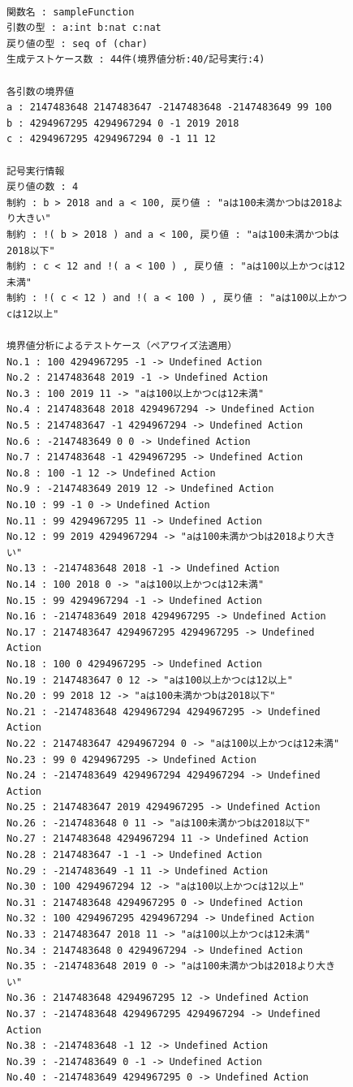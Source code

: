 \documentclass[uplatex, report, a4j, 10pt]{jsbook}
\begin{document}
\lstset{language=}
\begin{figure}[tp]
  \begin{lstlisting}[caption={拡張したBWDMに因子が3で水準が(6, 6, 6)の関数を持つ仕様(コード\ref{fig:pict4javaSampleVdm})を適用した際の出力},label=fig:pict4javaTekiyourei]

関数名 : sampleFunction
引数の型 : a:int b:nat c:nat 
戻り値の型 : seq of (char)
生成テストケース数 : 44件(境界値分析:40/記号実行:4)

各引数の境界値
a : 2147483648 2147483647 -2147483648 -2147483649 99 100 
b : 4294967295 4294967294 0 -1 2019 2018 
c : 4294967295 4294967294 0 -1 11 12 

記号実行情報
戻り値の数 : 4
制約 : b > 2018 and a < 100, 戻り値 : "aは100未満かつbは2018より大きい"
制約 : !( b > 2018 ) and a < 100, 戻り値 : "aは100未満かつbは2018以下"
制約 : c < 12 and !( a < 100 ) , 戻り値 : "aは100以上かつcは12未満"
制約 : !( c < 12 ) and !( a < 100 ) , 戻り値 : "aは100以上かつcは12以上"

境界値分析によるテストケース（ペアワイズ法適用）
No.1 : 100 4294967295 -1 -> Undefined Action
No.2 : 2147483648 2019 -1 -> Undefined Action
No.3 : 100 2019 11 -> "aは100以上かつcは12未満"
No.4 : 2147483648 2018 4294967294 -> Undefined Action
No.5 : 2147483647 -1 4294967294 -> Undefined Action
No.6 : -2147483649 0 0 -> Undefined Action
No.7 : 2147483648 -1 4294967295 -> Undefined Action
No.8 : 100 -1 12 -> Undefined Action
No.9 : -2147483649 2019 12 -> Undefined Action
No.10 : 99 -1 0 -> Undefined Action
No.11 : 99 4294967295 11 -> Undefined Action
No.12 : 99 2019 4294967294 -> "aは100未満かつbは2018より大きい"
No.13 : -2147483648 2018 -1 -> Undefined Action
No.14 : 100 2018 0 -> "aは100以上かつcは12未満"
No.15 : 99 4294967294 -1 -> Undefined Action
No.16 : -2147483649 2018 4294967295 -> Undefined Action
No.17 : 2147483647 4294967295 4294967295 -> Undefined Action
No.18 : 100 0 4294967295 -> Undefined Action
No.19 : 2147483647 0 12 -> "aは100以上かつcは12以上"
No.20 : 99 2018 12 -> "aは100未満かつbは2018以下"
No.21 : -2147483648 4294967294 4294967295 -> Undefined Action
No.22 : 2147483647 4294967294 0 -> "aは100以上かつcは12未満"
No.23 : 99 0 4294967295 -> Undefined Action
No.24 : -2147483649 4294967294 4294967294 -> Undefined Action
No.25 : 2147483647 2019 4294967295 -> Undefined Action
No.26 : -2147483648 0 11 -> "aは100未満かつbは2018以下"
No.27 : 2147483648 4294967294 11 -> Undefined Action
No.28 : 2147483647 -1 -1 -> Undefined Action
No.29 : -2147483649 -1 11 -> Undefined Action
No.30 : 100 4294967294 12 -> "aは100以上かつcは12以上"
No.31 : 2147483648 4294967295 0 -> Undefined Action
No.32 : 100 4294967295 4294967294 -> Undefined Action
No.33 : 2147483647 2018 11 -> "aは100以上かつcは12未満"
No.34 : 2147483648 0 4294967294 -> Undefined Action
No.35 : -2147483648 2019 0 -> "aは100未満かつbは2018より大きい"
No.36 : 2147483648 4294967295 12 -> Undefined Action
No.37 : -2147483648 4294967295 4294967294 -> Undefined Action
No.38 : -2147483648 -1 12 -> Undefined Action
No.39 : -2147483649 0 -1 -> Undefined Action
No.40 : -2147483649 4294967295 0 -> Undefined Action
\end{lstlisting}
\end{figure}
\end{document}
